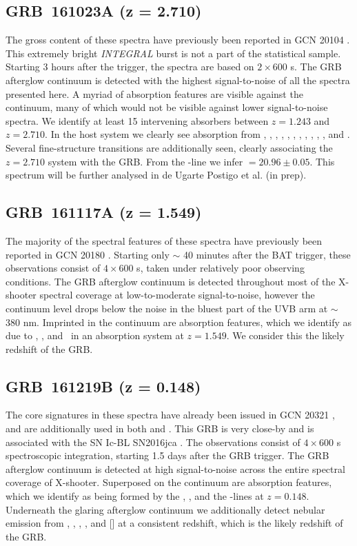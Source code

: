 \documentclass[longauth]{aa}    %
\begin{document}
\subsection{GRB~161023A (z = 2.710)}\label{161023}

The gross content of these spectra have previously been reported in GCN 20104
\citep{GCN20104}. This extremely bright \textit{INTEGRAL} burst is not a part of
the statistical sample. Starting 3 hours after the trigger, the spectra are
based on $2 \times 600$ s. The GRB afterglow continuum is detected with the
highest signal-to-noise of all the spectra presented here. A myriad of
absorption features are visible against the continuum, many of which would not be
visible against lower signal-to-noise spectra. We identify at least 15
intervening absorbers between $z = 1.243$ and $z = 2.710$. In the host system we
clearly see absorption from \lyb, \lya, \sii, \SIii, \oi, \SIiv, \civ, \alii,
\aliii, \feii, \mgii, and \mgi. Several fine-structure transitions are
additionally seen, clearly associating the $z = 2.710$ system with the GRB. From
the \lya-line we infer \nh$=20.96 \pm 0.05$. This spectrum will be further analysed in de Ugarte Postigo et al. (in prep).

\subsection{GRB~161117A (z = 1.549)}\label{161117}

The majority of the spectral features of these spectra have previously been
reported in GCN 20180 \citep{GCN20180}. Starting only $\sim$ 40 minutes after
the BAT trigger, these observations consist of $4 \times 600$ s, taken under
relatively poor observing conditions. The GRB afterglow continuum is detected
throughout most of the X-shooter spectral coverage at low-to-moderate
signal-to-noise, however the continuum level drops below the noise in the bluest
part of the UVB arm at $\sim$ 380 nm. Imprinted in the continuum are
absorption features, which we identify as due to \feii, \mgii, and \mgi~in an
absorption system at $z = 1.549$. We consider this the likely redshift of the
GRB.

\subsection{GRB~161219B (z = 0.148)}\label{161219}

The core signatures in these spectra have already been issued in GCN 20321
\citep{GCN20321}, and are additionally used in both \citet{Ashall2017} and
\citet{Cano2017}. This GRB is very close-by and is associated with the SN
Ic-BL SN2016jca \citep[GCN 20342;][]{GCN20342}. The observations consist of $4
\times 600$ s spectroscopic integration, starting 1.5 days after the GRB
trigger. The GRB afterglow continuum is detected at high signal-to-noise across
the entire spectral coverage of X-shooter. Superposed on the continuum are
absorption features, which we identify as being formed by the \mgii, \mgi, and
the \cahk-lines at $z = 0.148$. Underneath the glaring afterglow continuum we
additionally detect nebular emission from \oii, \hb, \oiii, \ha, and [\sii] at a
consistent redshift, which is the likely redshift of the GRB.
\end{document}
